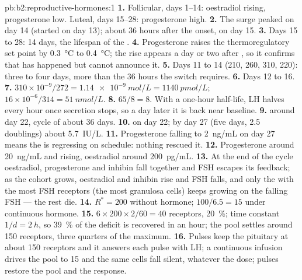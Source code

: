 \begin{solution}{pb:b2:reproductive-hormones:1}
\textbf{1.} Follicular, days 1--14: oestradiol rising, progesterone
low. Luteal, days 15--28: progesterone high.
\textbf{2.} The surge peaked on day 14 (started on day 13);
 about 36 hours after the onset, on day 15.
\textbf{3.} Days 15 to 28: 14 days, the lifespan of the .
\textbf{4.} Progesterone raises the thermoregulatory set point by
\qty{0.3}{\celsius} to \qty{0.4}{\celsius}; the rise appears a day or
two after , so it confirms that  has happened but
cannot announce it.
\textbf{5.} Days 11 to 14 (210, 260, 310, 220): three to four days,
more than the 36 hours the switch requires.
\textbf{6.} Days 12 to 16.
\textbf{7.} $310\times 10^{-9}/272 = \qty{1.14e-9}{mol/L} =
\qty{1140}{pmol/L}$; $16\times 10^{-6}/314 = \qty{51}{nmol/L}$.
\textbf{8.} $65/8 = 8$. With a one-hour half-life, LH halves every
hour once secretion stops, so a day later it is back near baseline.
\textbf{9.}  around day 22, cycle of about 36 days.
\textbf{10.}  on day 22; by day 27 (five days, 2.5
doublings) about \qty{5.7}{IU/L}.
\textbf{11.} Progesterone falling to \qty{2}{ng/mL} on day 27 means
the  is regressing on schedule: nothing rescued it.
\textbf{12.} Progesterone around \qty{20}{ng/mL} and rising,
oestradiol around \qty{200}{pg/mL}.
\textbf{13.} At the end of the cycle oestradiol, progesterone and
inhibin fall together and FSH escapes its feedback; as the cohort
grows, oestradiol and inhibin rise and FSH falls, and only the
 with the most FSH receptors (the most granulosa cells)
keeps growing on the falling FSH --- the rest die.
\textbf{14.} $R^* = 200$ without hormone; $100/6.5 = 15$ under
continuous hormone.
\textbf{15.} $6\times 200\times 2/60 = 40$ receptors, \qty{20}{\%};
time constant $1/d = \qty{2}{h}$, so \qty{39}{\%} of the deficit is
recovered in an hour; the pool settles around 150 receptors, three
quarters of the maximum.
\textbf{16.} Pulses keep the pituitary at about 150 receptors and it
answers each pulse with LH; a continuous infusion drives the pool to
15 and the same cells fall silent, whatever the dose; pulses restore
the pool and the response.

\end{solution}
